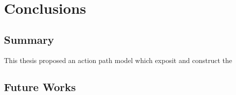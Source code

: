 \section{Conclusions}
\label{ch:final}

\subsection{Summary}

This thesis proposed an action path model which exposit and construct the 

\subsection{Future Works}

\cleardoublepage